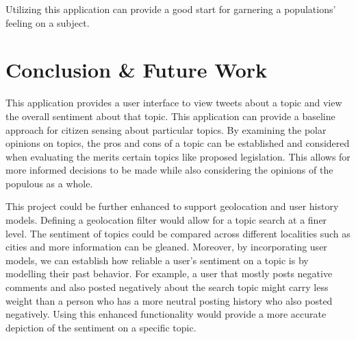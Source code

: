 Utilizing this application can provide a good start for garnering a populations' feeling on a subject. 

\section{Conclusion \& Future Work}
This application provides a user interface to view tweets about a topic and view the overall sentiment about that topic. This application can provide a baseline approach for citizen sensing about particular topics. By examining the polar opinions on topics, the pros and cons of a topic can be established and considered when evaluating the merits certain topics like proposed legislation. This allows for more informed decisions to be made while also considering the opinions of the populous as a whole.

This project could be further enhanced to support geolocation and user history models. Defining a geolocation filter would allow for a topic search at a finer level. The sentiment of topics could be compared across different localities such as cities and more information can be gleaned. Moreover, by incorporating user models, we can establish how reliable a user's sentiment on a topic is by modelling their past behavior. For example, a user that mostly posts negative comments and also posted negatively about the search topic might carry less weight than a person who has a more neutral posting history who also posted negatively. Using this enhanced functionality would provide a more accurate depiction of the sentiment on a specific topic.

 

\pagebreak




